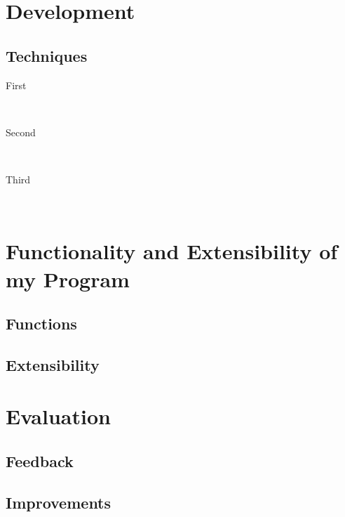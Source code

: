\documentclass[12pt]{article} %
\begin{document}
\section{Development} %

\subsection{Techniques} %

\begin{description} %

\item[First] \hfill \\


\item[Second] \hfill \\


\item[Third] \hfill \\


\end{description} 


\vfill

\section{Functionality and Extensibility of my Program}

\subsection{Functions} %

\subsection{Extensibility} %

\vfill

\section{Evaluation} 

\subsection{Feedback}

\subsection{Improvements}

\vfill

\end{document}
